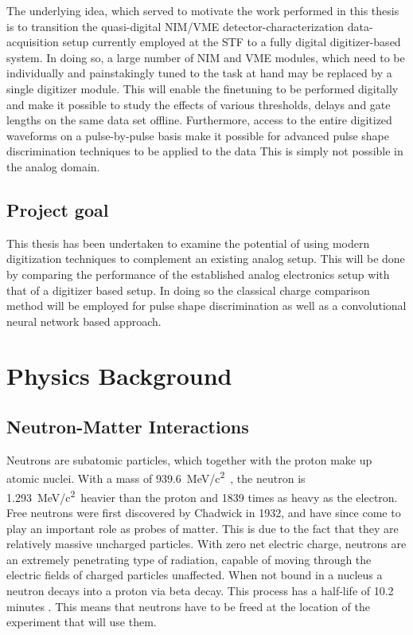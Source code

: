 \documentclass[main.tex]{subfiles}
\begin{document}
The underlying idea, which served to motivate the work performed in this thesis is to transition the quasi-digital NIM/VME detector-characterization data-acquisition setup currently employed at the STF to a fully digital digitizer-based  system. In doing so, a large number of NIM and VME modules, which need to be individually and painstakingly tuned to the task at hand may be replaced by a single digitizer module. This will enable the finetuning to be performed digitally and make it possible to study the effects of various thresholds, delays and gate lengths on the same data set offline. Furthermore, access to the entire digitized waveforms on a pulse-by-pulse basis make it possible for advanced pulse shape discrimination techniques to be applied to the data This is simply not possible in the analog domain.

\subsection{Project goal}
This thesis has been undertaken to examine the potential of using modern digitization techniques to complement an existing analog setup. This will be done by comparing the performance of the established analog electronics setup with that of a digitizer based setup. In doing so the classical charge comparison method will be employed for pulse shape discrimination as well as a convolutional neural network based approach.

\section{Physics Background}
\subsection{Neutron-Matter Interactions}\label{sec:neutronMatterInteractions}
Neutrons are subatomic particles, which together with the proton make up atomic nuclei. With a mass of \SI{939.6}{\MeV/c^2\;}, the neutron is \SI{1.293}{\MeV/c^2\;}heavier than the proton and 1839 times as heavy as the electron. Free neutrons were first discovered by Chadwick in 1932, and have since come to play an important role as probes of matter. This is due to the fact that they are relatively massive uncharged particles. With zero net electric charge, neutrons are an extremely penetrating type of radiation, capable of moving through the electric fields of charged particles unaffected. When not bound in a nucleus a neutron decays into a proton via beta decay. This process has a half-life of 10.2 minutes \cite{Nudat}. This means that neutrons have to be freed at the location of the experiment that will use them.
\end{document}
